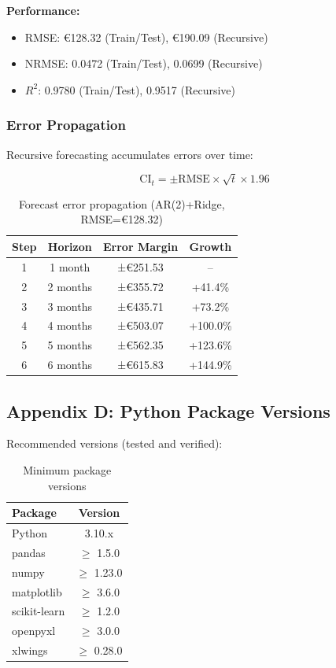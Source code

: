 \documentclass[11pt,a4paper]{article}
\begin{document}
\textbf{Performance:}
\begin{itemize}[leftmargin=*]
    \item RMSE: €128.32 (Train/Test), €190.09 (Recursive)
    \item NRMSE: 0.0472 (Train/Test), 0.0699 (Recursive)
    \item $R^2$: 0.9780 (Train/Test), 0.9517 (Recursive)
\end{itemize}

\subsubsection{Error Propagation}

Recursive forecasting accumulates errors over time:

\begin{equation}
\text{CI}_t = \pm \text{RMSE} \times \sqrt{t} \times 1.96
\end{equation}

\begin{table}[h]
\centering
\begin{tabular}{@{} c c c c @{}}
\toprule
\textbf{Step} & \textbf{Horizon} & \textbf{Error Margin} & \textbf{Growth} \\
\midrule
1 & 1 month & ±€251.53 & -- \\
2 & 2 months & ±€355.72 & +41.4\% \\
3 & 3 months & ±€435.71 & +73.2\% \\
4 & 4 months & ±€503.07 & +100.0\% \\
5 & 5 months & ±€562.35 & +123.6\% \\
6 & 6 months & ±€615.83 & +144.9\% \\
\bottomrule
\end{tabular}
\caption{Forecast error propagation (AR(2)+Ridge, RMSE=€128.32)}
\end{table}

\subsection{Appendix D: Python Package Versions}

Recommended versions (tested and verified):

\begin{table}[h]
\centering
\begin{tabular}{@{} l c @{}}
\toprule
\textbf{Package} & \textbf{Version} \\
\midrule
Python & 3.10.x \\
pandas & $\geq$ 1.5.0 \\
numpy & $\geq$ 1.23.0 \\
matplotlib & $\geq$ 3.6.0 \\
scikit-learn & $\geq$ 1.2.0 \\
openpyxl & $\geq$ 3.0.0 \\
xlwings & $\geq$ 0.28.0 \\
\bottomrule
\end{tabular}
\caption{Minimum package versions}
\end{table}
\end{document}
